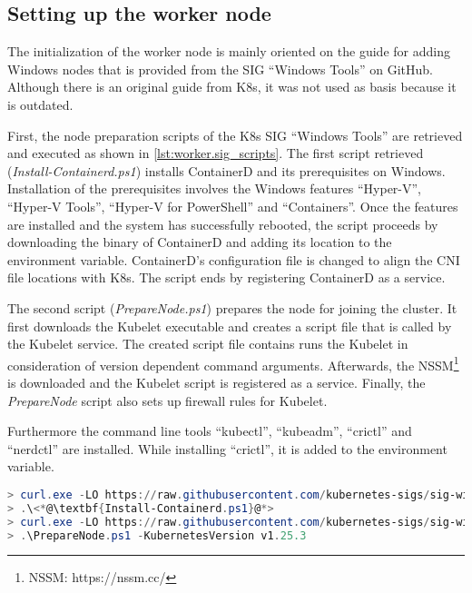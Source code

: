 \subsection{Setting up the worker node}
The initialization of the worker node is mainly oriented on the guide for adding \ac{Windows} nodes that is provided from the \ac{SIG} \enquote{Windows Tools} on GitHub\cite{GitHubKubernetesSIGWindowsTools.20230213}. Although there is an original guide from \ac{K8s}\cite{Kubernetes.20220419}, it was not used as basis because it is outdated.

First, the node preparation scripts of the \ac{K8s} \ac{SIG} \enquote{Windows Tools} are retrieved and executed as shown in \autoref{lst:worker.sig_scripts}. The first script retrieved (\textit{Install-Containerd.ps1}) installs ContainerD and its prerequisites on \ac{Windows}. Installation of the prerequisites involves the Windows features \enquote{Hyper-V}, \enquote{Hyper-V Tools}, \enquote{Hyper-V for PowerShell} and \enquote{Containers}. Once the features are installed and the system has successfully rebooted, the script proceeds by downloading the binary of ContainerD and adding its location to the  environment variable. ContainerD's configuration file is changed to align the \ac{CNI} file locations with \ac{K8s}. The script ends by registering ContainerD as a service.

The second script (\textit{PrepareNode.ps1}) prepares the node for joining the cluster. It first downloads the Kubelet executable and creates a script file that is called by the Kubelet service. The created script file contains runs the Kubelet in consideration of version dependent command arguments. Afterwards, the \ac{NSSM}\footnote{NSSM: https://nssm.cc/} is downloaded and the Kubelet script is registered as a service. Finally, the \textit{PrepareNode} script also sets up firewall rules for Kubelet.

Furthermore the command line tools \enquote{kubectl}, \enquote{kubeadm}, \enquote{crictl} and \enquote{nerdctl} are installed. While installing \enquote{crictl}, it is added to the  environment variable.

\begin{lstlisting}[label=lst:worker.sig_scripts, caption={Retrieval of node preparation scripts\cite{GitHubKubernetesSIGWindowsTools.20230213}}, language=PowerShell, morekeywords={curl.exe, Install-Containerd.ps1, PrepareNode.ps1}]
> curl.exe -LO https://raw.githubusercontent.com/kubernetes-sigs/sig-windows-tools/master/kubeadm/scripts/Install-Containerd.ps1
> .\<*@\textbf{Install-Containerd.ps1}@*>
> curl.exe -LO https://raw.githubusercontent.com/kubernetes-sigs/sig-windows-tools/master/kubeadm/scripts/Prepare<*@\kern.7pt@*>Node.ps1
> .\PrepareNode.ps1 -KubernetesVersion v1.25.3
\end{lstlisting}

